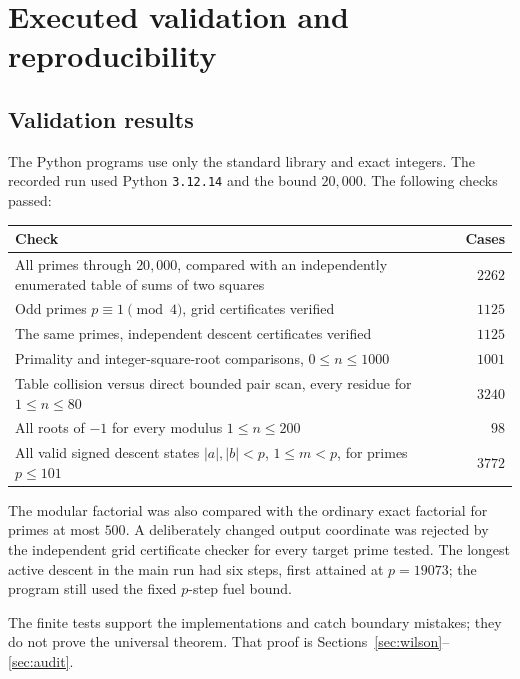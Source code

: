 \documentclass[11pt,letterpaper]{article}
\theoremstyle{definition}
\theoremstyle{remark}
\newcommand{\abs}[1]{\lvert #1\rvert}
\begin{document}
\section{Executed validation and reproducibility}
\label{sec:validation}

\subsection{Validation results}

The Python programs use only the standard library and exact integers.
The recorded run used Python \texttt{3.12.14} and the bound \(20{,}000\).
The following checks passed:

\begin{center}
\begin{tabular}{@{}p{}r@{}}
\toprule
Check & Cases\\
\midrule
All primes through \(20{,}000\), compared with an independently enumerated
table of sums of two squares & \(2262\)\\
Odd primes \(p\equiv1\pmod4\), grid certificates verified & \(1125\)\\
The same primes, independent descent certificates verified & \(1125\)\\
Primality and integer-square-root comparisons, \(0\le n\le1000\) & \(1001\)\\
Table collision versus direct bounded pair scan, every residue for
\(1\le n\le80\) & \(3240\)\\
All roots of \(-1\) for every modulus \(1\le n\le200\) & \(98\)\\
All valid signed descent states \(\abs a,\abs b<p\), \(1\le m<p\),
for primes \(p\le101\) & \(3772\)\\
\bottomrule
\end{tabular}
\end{center}

The modular factorial was also compared with the ordinary exact factorial
for primes at most \(500\). A deliberately changed output coordinate was
rejected by the independent grid certificate checker for every target
prime tested. The longest active descent in the main run had six steps,
first attained at \(p=19073\); the program still used the fixed \(p\)-step
fuel bound.

The finite tests support the implementations and catch boundary mistakes;
they do not prove the universal theorem. That proof is
Sections~\ref{sec:wilson}--\ref{sec:audit}.
\end{document}
